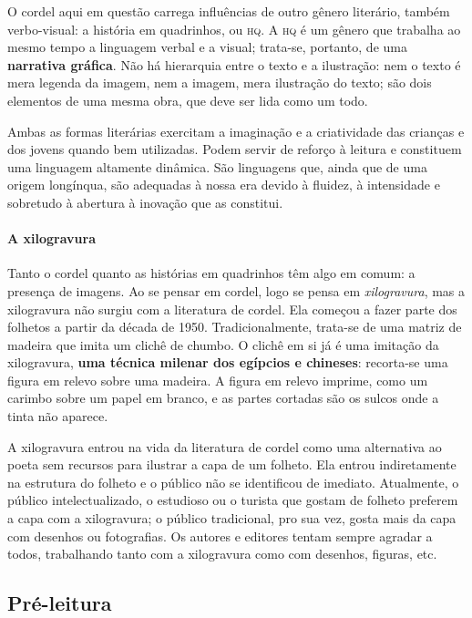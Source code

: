 \documentclass[11pt]{extarticle}
\begin{document}
O cordel aqui em questão carrega influências de outro gênero literário, também
verbo-visual: a história em quadrinhos, ou \textsc{hq}. A \textsc{hq} é um 
gênero que trabalha ao mesmo tempo a linguagem verbal e a visual; trata-se, portanto, de 
uma \textbf{narrativa gráfica}. Não há hierarquia entre o texto e a ilustração: nem 
o texto é mera legenda da imagem, nem a imagem, mera ilustração do texto; são dois elementos 
de uma mesma obra, que deve ser lida como um todo.

Ambas as formas literárias exercitam a imaginação e a criatividade das crianças e dos jovens 
quando bem utilizadas. Podem servir de reforço à leitura e constituem uma linguagem altamente dinâmica. 
São linguagens que, ainda que de uma origem longínqua, são adequadas à nossa era devido à fluidez, 
à intensidade e sobretudo à abertura à inovação que as constitui.

\paragraph{A xilogravura}

Tanto o cordel quanto as histórias em quadrinhos têm algo em comum:
a presença de imagens. Ao se pensar em cordel, logo se pensa em \textit{xilogravura}, 
mas a xilogravura não surgiu com a literatura de cordel. Ela começou a fazer
parte dos folhetos a partir da década de 1950. Tradicionalmente, trata-se
de uma matriz de madeira que imita um clichê de chumbo. O clichê em si 
já é uma imitação da xilogravura, \textbf{uma técnica milenar dos egípcios
e chineses}: recorta-se uma figura em relevo sobre uma madeira. A figura 
em relevo imprime, como um carimbo sobre um papel em branco, e as partes
cortadas são os sulcos onde a tinta não aparece. 

A xilogravura entrou na vida da literatura de cordel como uma alternativa 
ao poeta sem recursos para ilustrar a capa de um folheto. Ela entrou indiretamente na 
estrutura do folheto e o público não se identificou de imediato. Atualmente, 
o público intelectualizado, o estudioso ou o turista que gostam de folheto preferem a capa com a xilogravura; o público 
tradicional, pro sua vez, gosta mais da capa com desenhos ou fotografias. 
Os autores e editores tentam sempre agradar a todos, trabalhando tanto com a xilogravura 
como com desenhos, figuras, etc.

\subsection{Pré-leitura}
\end{document}
